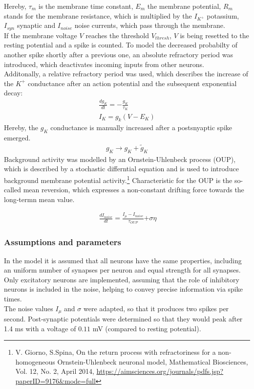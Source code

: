 \documentclass[12pt,a4paper, bibliography=totoc, listof=numbered, footexclude]{scrartcl}
\begin{document}
 Hereby, $\tau_m$ is the membrane time constant, $E_m$ the membrane potential, $R_m$ stands for the membrane resistance, which is multiplied by the $I_{K^+}$ potassium, $ I_{syn}$ synaptic and $I_{noise}$  noise currents, which pass through the membrane. \\
 If the membrane voltage $V$ reaches the threshold  $V_{thresh}$, $V$ is being resetted to the resting potential and a spike is counted. To model the decreased probabilty of another spike shortly after a previous one, an absolute refractory period was introduced, which deactivates incoming inputs from other neurons.\\
 Additonally, a relative refractory period was used, which describes the increase of the $K^+$ conductance after an action potential and the subsequent exponential decay:
  \begin{align}
  \frac{d g_K}{dt}=-\frac{g_K}{\tau_K} \\
  I_K=g_k(V-E_K)
  \end{align}
  Hereby, the $g_K$ conductance is manually increased after a postsnyaptic spike emerged.
  \begin{align}
   	g_K \rightarrow g_K + {\tilde{g}}_K
  \end{align}
  Background activity was modelled by an Ornstein-Uhlenbeck process (OUP), which is described by a stochastic differntial equation and is used to introduce background membrane potential activity.\footnote{V. Giorno, S.Spina, On the return process with refractoriness for a non-homogeneous Ornstein-Uhlenbeck neuronal model, Mathematical Biosciences, Vol. 12, No. 2, April 2014, \url{https://aimsciences.org/journals/pdfs.jsp?paperID=9176&mode=full}} Characteristic for the OUP is the so-called mean reversion, which expresses a non-constant drifting force towards the long-termn mean value.
  

   \begin{align}
   \  \frac{d I_{noise}}{dt}=\frac{{I_\mu}-I_{noise}}{\tau_{OUP}} {+ \sigma \eta}
   \end{align}
   
  \subsubsection*{Assumptions and parameters}
  In the model it is assumed that all neurons have the same properties, including an uniform number of synapses per neuron and equal strength for all synapses.
  Only excitatory neurons are implemented, assuming that the role of inhibitory neurons is included in the noise, helping to convey precise information via spike times.\\
  The noise values $I_{\mu}$ and $\sigma$ were adapted, so that it produces two spikes per second.
   Post-synaptic potentials were determined so that they would peak after 1.4 ms with a voltage of $0.11$ mV (compared to resting potential). 
\end{document}
